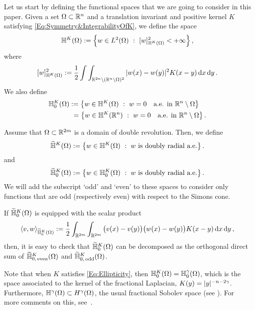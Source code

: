 Let us start by defining the functional spaces that we are going to consider in this paper. Given a set $\Omega \subset \mathbb{R}^n$ and a translation invariant and positive kernel $K$ satisfying \eqref{Eq:Symmetry&IntegrabilityOfK}, we define the space
$$
\mathbb{H}^K(\Omega) := \left \{ w \in L^2(\Omega) \ : \ [w]^2_{\mathbb{H}^K(\Omega)} < + \infty \right \},
$$
where
$$
[w]^2_{\mathbb{H}^K(\Omega)} := \dfrac{1}{2}\int\int_{\mathbb{R}^{2n} \setminus (\mathbb{R}^n\setminus\Omega)^2} |w(x) - w(y)|^2 K(x-y) \,\mathrm{d} x \,\mathrm{d} y\,.
$$
We also define
\begin{align*}
\mathbb{H}^K_0(\Omega) &:= \left \{ w \in \mathbb{H}^K(\Omega) \ : \  w = 0 \quad \textrm{a.e. in } \mathbb{R}^n \setminus \Omega \right \} \\
&\ = \left \{ w \in \mathbb{H}^K(\mathbb{R}^n) \ : \  w = 0 \quad \textrm{a.e. in } \mathbb{R}^n \setminus \Omega \right \}.
\end{align*}

Assume that $\Omega \subset \mathbb{R}^{2m}$ is a domain of double revolution. Then, we define
$$
\widetilde{\mathbb{H}}^K(\Omega) := \left \{ w \in \mathbb{H}^K(\Omega) \ : \ w \textrm{ is doubly radial a.e.} \right \}.
$$
and
$$
\widetilde{\mathbb{H}}^K_0(\Omega) := \left \{ w \in \mathbb{H}^K_0(\Omega) \ : \ w \textrm{ is doubly radial a.e.} \right \}.
$$
We will add the subscript `odd' and `even' to these spaces to consider only functions that are odd (respectively even) with respect to the Simons cone.


\begin{remark}
	\label{Remark:DecompositionHK}
	If $\widetilde{\mathbb{H}}^K_0(\Omega)$ is equipped with the scalar product
	$$
	\langle v,w \rangle_{\widetilde{\mathbb{H}}^K_0(\Omega)} := \dfrac{1}{2}\int_{\mathbb{R}^{2m}} \int_{\mathbb{R}^{2m}}  \big(v(x) - v(y)\big)\big(w(x) - w(y)\big) K(x-y) \,\mathrm{d} x \,\mathrm{d} y\,,
	$$
	then, it is easy to check that $\widetilde{\mathbb{H}}^K_0(\Omega)$ can be decomposed as the orthogonal
	direct sum of $\widetilde{\mathbb{H}}^K_{0,\, \mathrm{even}}(\Omega)$ and $\widetilde{\mathbb{H}}^K_{0,\,
		\mathrm{odd}}(\Omega)$.
\end{remark}

Note that when $K$ satisfies \eqref{Eq:Ellipticity}, then $\mathbb{H}^K_0 (\Omega) = \mathbb{H}^\gamma_0 (\Omega)$,
which is the space associated to the kernel of the fractional Laplacian, $K(y) = |y|^{-n-2\gamma}$.
Furthermore, $\mathbb{H}^\gamma(\Omega) \subset H^\gamma(\Omega)$, the usual fractional Sobolev space (see
\cite{HitchhikerGuide}).  For more comments on this, see~\cite{CozziPassalacqua}.


